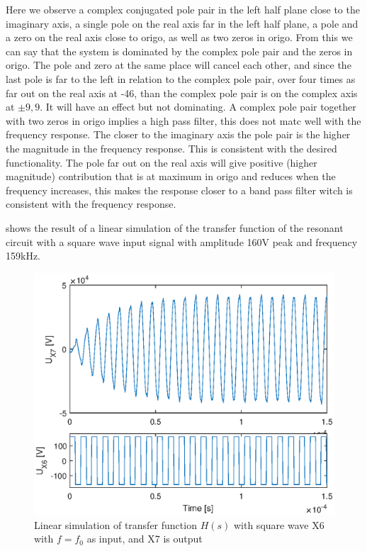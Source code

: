 Here we observe a complex conjugated pole pair in the left half plane close to the imaginary axis, a single pole on the real axis far in the left half plane, a pole and a zero on the real axis close to origo, as well as two zeros in origo. From this we can say that the system is dominated by the complex pole pair and the zeros in origo. The pole and zero at the same place will cancel each other, and since the last pole is far to the left in relation to the complex pole pair, over four times as far out on the real axis at -46, than the complex pole pair is on the complex axis at $\pm 9,9$. It will have an effect but not dominating. A complex pole pair together with two zeros in origo implies a high pass filter, this does not matc well with the frequency response. The closer to the imaginary axis the pole pair is the higher the magnitude in the frequency response. This is consistent with the desired functionality. The pole far out on the real axis will give positive (higher magnitude) contribution that is at maximum in origo and reduces when the frequency increases, this makes the response closer to a band pass filter witch is consistent with the frequency response.

 shows the result of a linear simulation of the transfer function of the resonant circuit with a square wave input signal with amplitude 160V peak and frequency 159kHz.

\begin{figure}[H]
    \centering
    \includegraphics[width=\textwidth]{img/CoilRigSimulation.eps}
    \caption{Linear simulation of transfer function $H(s)$ with square wave X6 with $f=f_0$ as input, and X7 is output}
    \label{fig:crlinsim}
\end{figure}

